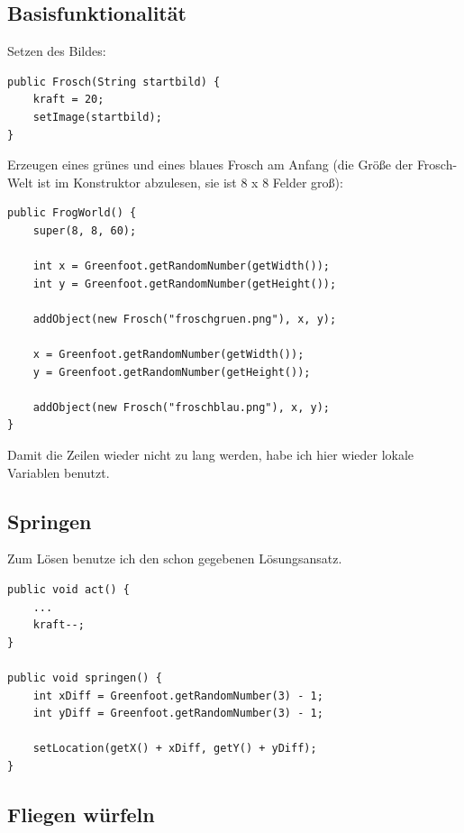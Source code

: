 \documentclass{scrartcl}   %
\begin{document}
\newpage

\subsection{Basisfunktionalität}

\begin{itemize}
    \barrow Setzen des Bildes:\\
    \begin{lstlisting}
public Frosch(String startbild) {
    kraft = 20;
    setImage(startbild);
}
    \end{lstlisting}
    \barrow Erzeugen eines grünes und eines blaues Frosch am Anfang (die Größe der Frosch-Welt ist im Konstruktor abzulesen, sie ist 8 x 8 Felder groß):\\
    \begin{lstlisting}
public FrogWorld() {    
    super(8, 8, 60);
    
    int x = Greenfoot.getRandomNumber(getWidth());
    int y = Greenfoot.getRandomNumber(getHeight());
    
    addObject(new Frosch("froschgruen.png"), x, y);
    
    x = Greenfoot.getRandomNumber(getWidth());
    y = Greenfoot.getRandomNumber(getHeight());
    
    addObject(new Frosch("froschblau.png"), x, y);
}
    \end{lstlisting}
    
    Damit die Zeilen wieder nicht zu lang werden, habe ich hier wieder lokale Variablen benutzt.
\end{itemize}

\newpage

\subsection{Springen}

Zum Lösen benutze ich den schon gegebenen Lösungsansatz.\\
\begin{lstlisting}
public void act() {
    ...
    kraft--;
}

public void springen() {
    int xDiff = Greenfoot.getRandomNumber(3) - 1;
    int yDiff = Greenfoot.getRandomNumber(3) - 1;
    
    setLocation(getX() + xDiff, getY() + yDiff);
}
\end{lstlisting}

\subsection{Fliegen würfeln}
\end{document}
